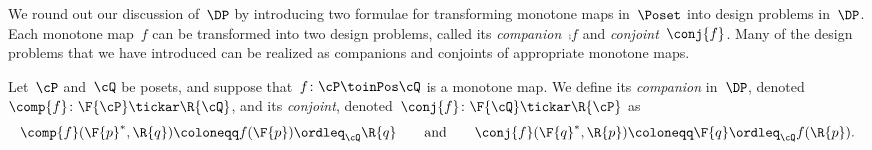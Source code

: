 We round out our discussion of~$\DP$ by introducing two formulae for transforming monotone maps in~$\Poset$ into design problems in~$\DP$. Each monotone map~$f$ can be transformed into two design problems, called its \emph{companion}~$\comp{f}$ and \emph{conjoint}~$\conj{f}$. Many of the design problems that we have introduced can be realized as companions and conjoints of appropriate monotone maps.

\begin{definition}
\label{def:comp_conj}
Let~$\cP $ and~$\cQ $ be posets, and suppose that~$f\colon\cP \toinPos \cQ $ is a monotone map. We define its \emph{companion} in~$\DP$, denoted~$\comp{f}\colon \F{\cP} \tickar \R{\cQ}$,
and its \emph{conjoint}, denoted~$\conj{f}\colon \F{\cQ} \tickar \R{\cP}$ as
\begin{equation}
\comp{f}(\F{p}^*,\R{q})\coloneqq f(\F{p}) \ordleq_\cQ \R{q}
\qquad\text{and}\qquad
\conj{f}(\F{q}^*,\R{p})\coloneqq \F{q} \ordleq_\cQ f(\R{p}).
\end{equation}
\end{definition}

